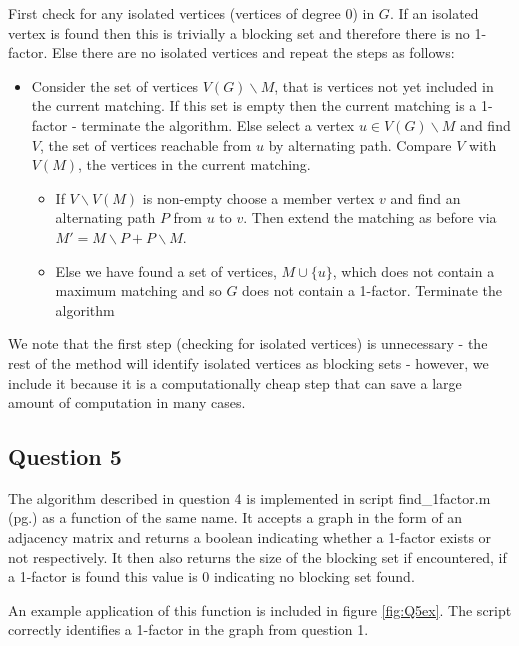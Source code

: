 \documentclass[a4paper]{article}
\begin{document}
\bigskip
First check for any isolated vertices (vertices of degree 0) in $G$. If an isolated vertex is found then this is trivially a blocking set and therefore there is no 1-factor. Else there are no isolated vertices and repeat the steps as follows:
\renewcommand\labelitemii{\textbullet}
\begin{itemize}
    \item
    Consider the set of vertices $V(G)\backslash M$, that is vertices not yet included in the current matching. If this set is empty then the current matching is a 1-factor - terminate the algorithm. Else select a vertex $u\in V(G)\backslash M$ and find $V$, the set of vertices reachable from $u$ by alternating path. Compare $V$ with $V(M)$, the vertices in the current matching.
    \begin{itemize}
        \item
        If $V\backslash V(M)$ is non-empty choose a member vertex $v$ and find an alternating path $P$ from $u$ to $v$. Then extend the matching as before via $M' = M\backslash P + P\backslash M$.
        \item
        Else we have found a set of vertices, $M\cup\{u\}$, which does not contain a maximum matching and so $G$ does not contain a 1-factor. Terminate the algorithm
    \end{itemize}
\end{itemize}
We note that the first step (checking for isolated vertices) is unnecessary - the rest of the method will identify isolated vertices as blocking sets - however, we include it because it is a computationally cheap step that can save a large amount of computation in many cases.

\subsection*{Question 5}

The algorithm described in question 4 is implemented in script find\_1factor.m (pg.\pageref{Pfind_1factor}) as a function of the same name. It accepts a graph in the form of an adjacency matrix and returns a boolean indicating whether a 1-factor exists or not respectively. It then also returns the size of the blocking set if encountered, if a 1-factor is found this value is 0 indicating no blocking set found.

\bigskip
An example application of this function is included in figure \ref{fig:Q5ex}. The script correctly identifies a 1-factor in the graph from question 1.
\end{document}
